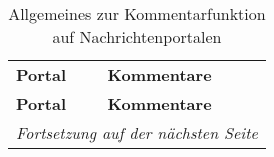 \begin{landscape} \footnotesize
\begin{longtable}{lp{170mm}}

  \caption{Allgemeines zur Kommentarfunktion auf Nachrichtenportalen} \\ \\
  \toprule
  \bfseries Portal & \bfseries Kommentare \\\midrule[\heavyrulewidth]
  \endfirsthead

  \toprule
  \bfseries Portal & \bfseries Kommentare \\\midrule[\heavyrulewidth]
  \endfirsthead

  \bottomrule
  \multicolumn{2}{r}{\emph{Fortsetzung auf der nächsten Seite}}
  \endfoot

  \bottomrule
  \endlastfoot


\end{longtable}
\end{landscape}
